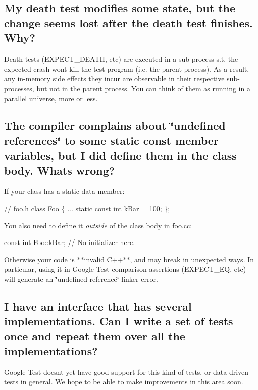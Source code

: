 \subsection*{My death test modifies some state, but the change seems lost after the death test finishes. Why?}

Death tests ({\ttfamily E\+X\+P\+E\+C\+T\+\_\+\+D\+E\+A\+TH}, etc) are executed in a sub-\/process s.\+t. the expected crash won\textquotesingle{}t kill the test program (i.\+e. the parent process). As a result, any in-\/memory side effects they incur are observable in their respective sub-\/processes, but not in the parent process. You can think of them as running in a parallel universe, more or less.

\subsection*{The compiler complains about \char`\"{}undefined references\char`\"{} to some static const member variables, but I did define them in the class body. What\textquotesingle{}s wrong?}

If your class has a static data member\+:


\begin{DoxyCode}
// foo.h
class Foo \{
  ...
  static const int kBar = 100;
\};
\end{DoxyCode}


You also need to define it {\itshape outside} of the class body in {\ttfamily foo.\+cc}\+:


\begin{DoxyCode}
const int Foo::kBar;  // No initializer here.
\end{DoxyCode}


Otherwise your code is $\ast$$\ast$invalid C++$\ast$$\ast$, and may break in unexpected ways. In particular, using it in Google Test comparison assertions ({\ttfamily E\+X\+P\+E\+C\+T\+\_\+\+EQ}, etc) will generate an \char`\"{}undefined reference\char`\"{} linker error.

\subsection*{I have an interface that has several implementations. Can I write a set of tests once and repeat them over all the implementations?}

Google Test doesn\textquotesingle{}t yet have good support for this kind of tests, or data-\/driven tests in general. We hope to be able to make improvements in this area soon.

